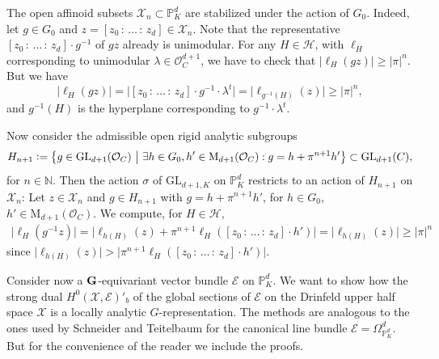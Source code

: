 \documentclass[a4paper, reqno, 10pt]{amsart}
\theoremstyle{definition}
\numberwithin{equation}{section}
\newcommand{\abs}[1]{{\lvert{#1}\rvert}}
\renewcommand{\det}{{\mathrm{det}}}
\newcommand{\defeq}{\vcentcolon=}
\newcommand{\GL}{{\mathrm{GL}}}
\let\originalmiddle\middle
\renewcommand{\middle}[1]{\,\originalmiddle#1\,}
\newcommand{\BN}{{\mathbb {N}}}
\newcommand{\BP}{{\mathbb {P}}}
\newcommand{\CE}{{\mathcal {E}}}
\newcommand{\CH}{{\mathcal {H}}}
\newcommand{\CO}{{\mathcal {O}}}
\newcommand{\CX}{{\mathcal {X}}}
\newcommand{\bG}{{\mathrm{\bf G}}}
\newcommand{\unif}{{\pi}}
\begin{document}
The open affinoid subsets $\CX_n \subset \BP_K^d$ are stabilized under the action of $G_0$.
Indeed, let $g \in G_0$ and $z=[z_0{\,:\,}\ldots{\,:\,}z_d] \in \CX_n$.
Note that the representative $[z_0{\,:\,}\ldots{\,:\,}z_d]\cdot g^{-1}$ of $gz$ already is unimodular.
For any $H \in \CH$, with $\ell_H$ corresponding to unimodular $\lambda \in \CO_C^{d+1}$, we have to check that $\abs{\ell_H(gz)} \geq \abs{\unif}^n$.
But we have
\[\abs{\ell_H(gz)} = \abs{[z_0{\,:\,}\ldots{\,:\,}z_d] \cdot g^{-1}\cdot \lambda^t } = \abs{\ell_{g^{-1}(H)}(z)} \geq \abs{\unif}^n ,\]
and $g^{-1}(H)$ is the hyperplane corresponding to $g^{-1}\cdot \lambda^t$.



Now consider the admissible open rigid analytic subgroups
\begin{equation}\label{Eq 2 - nth-level rigid analytic subgroup around G_0}
	H_{n+1} \defeq \left\{g\in \GL_{d+1}(\CO_C) \middle{|} \exists h \in G_0, h' \in \mathrm{M}_{d+1}(\CO_C): g = h + \unif^{n+1} h' \right\} \subset \GL_{d+1}(C), 
\end{equation}
for $n\in \BN$.
Then the action $\sigma$ of $\GL_{d+1,K}$ on $\BP_K^d$ restricts to an action of $H_{n+1}$ on $\CX_{n}$:
Let $z \in \CX_n$ and $g \in H_{n+1}$ with $g = h + \unif^{n+1} h'$, for $h \in G_0$, $h' \in \mathrm{M}_{d+1}(\CO_C)$.
We compute, for $H \in \CH$,
\begin{align*}
	\abs{\ell_H (g^{-1} z)} = \abs{\ell_{h(H)}(z) + \unif^{n+1} \ell_H([z_0{\,:\,}\ldots{\,:\,}z_d] \cdot h') }
	= \abs{\ell_{h(H)}(z)} \geq \abs{\unif}^{n}
\end{align*}
since $\abs{\ell_{h(H)}(z)} >  \abs{\unif^{n+1} \ell_H([z_0{\,:\,}\ldots{\,:\,}z_d] \cdot h')}$.



Consider now a $\bG$-equivariant vector bundle $\CE$ on $\BP_K^d$.
We want to show how the strong dual $H^0 (\CX,\CE)'_b$ of the global sections of $\CE$ on the Drinfeld upper half space $\CX$ is a locally analytic $G$-representation.
The methods are analogous to the ones used by Schneider and Teitelbaum \cite{SchneiderTeitelbaum02pAdicBoundVal} for the canonical line bundle $\CE = \Omega^d_{\BP_K^d}$.
But for the convenience of the reader we include the proofs.
\end{document}
